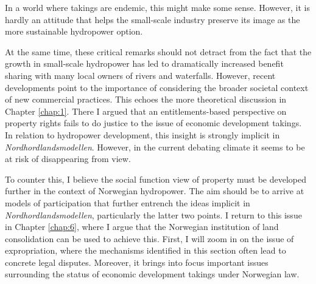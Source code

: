 In a world where takings are endemic, this might make some sense. However, it is hardly an attitude that helps the small-scale industry preserve its image as the more sustainable hydropower option.


At the same time, these critical remarks should not detract from the fact that the growth in small-scale hydropower has led to dramatically increased benefit sharing with many local owners of rivers and waterfalls. However, recent developments point to the importance of considering the broader societal context of new commercial practices. This echoes the more theoretical discussion in Chapter \ref{chap:1}. There I argued that an entitlements-based perspective on property rights fails to do justice to the issue of economic development takings. In relation to hydropower development, this insight is strongly implicit in {\it Nordhordlandsmodellen}. However, in the current debating climate it seems to be at risk of disappearing from view.

To counter this, I believe the social function view of property must be developed further in the context of Norwegian hydropower. The aim should be to arrive at models of participation that further entrench the ideas implicit in {\it Nordhordlandsmodellen}, particularly the latter two points. I return to this issue in Chapter \ref{chap:6}, where I argue that the Norwegian institution of land consolidation can be used to achieve this. First, I will zoom in on the issue of expropriation, where the mechanisms identified in this section often lead to concrete legal disputes. Moreover, it brings into focus important issues surrounding the status of economic development takings under Norwegian law.


